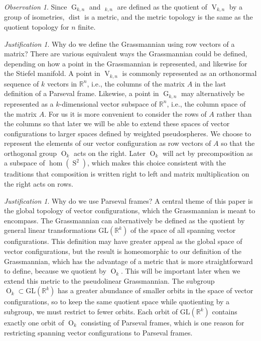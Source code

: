 \documentclass[11pt]{article}
\newcommand{\ie}{i.e.,\xspace}
\numberwithin{equation}{section}
\theoremstyle{remark}
\newtheorem{observation}[theorem]{Observation}
\newtheorem{justification}[theorem]{Justification}
\let\mb\mathbb
\DeclareMathOperator{\dist}{dist}
\DeclareMathOperator{\g}{G}
\DeclareMathOperator{\oG}{\widetilde G}
\DeclareMathOperator{\orth}{O}
\DeclareMathOperator{\stief}{V}
\DeclareMathOperator{\sphere}{S}
\begin{document}
\begin{observation}
Since $\g_{k,n}$ and $\oG_{k,n}$ are defined as the quotient of $\stief_{k,n}$ by a group of isometries, $\dist$ is a metric, and the metric topology is the same as the quotient topology for $n$ finite.
\end{observation}

\begin{justification}
Why do we define the Grassmannian using row vectors of a matrix?
There are various equivalent ways the Grassmannian could be defined, depen\-ding on how a point in the Grassmannian is represented, and likewise for the Stiefel manifold.
A point in $\stief_{k,n}$ is commonly represented as an orthonormal sequence of $k$ vectors in $\mb{R}^n$, \ie the columns of the matrix $A$ in the last definition of a Parseval frame.
Likewise, a point in $\g_{k,n}$ may alternatively be represented as a $k$-dimensional vector subspace of $\mb{R}^n$, \ie the column space of the matrix $A$.
For us it is more convenient to consider the rows of $A$ rather than the columns so that later we will be able to extend these spaces of vector configurations to larger spaces defined by weighted pseudospheres.
We choose to represent the elements of our vector configuration as row vectors of $A$ so that the orthogonal group $\orth_k$ acts on the right. Later $\orth_k$ will act by precomposition as a subspace of $\hom(\sphere^2)$, which makes this choice consistent with the traditions that composition is written right to left and matrix multiplication on the right acts on rows.
\end{justification}

\begin{justification}
Why do we use Parseval frames?
A central theme of this paper is the global topology of vector configurations, which the Grassmannian is meant to encompass.
The Grassmannian can alternatively be defined as the quotient by general linear transformations $\mathrm{GL}(\mb{R}^k)$ of the space of all spanning vector configurations. This definition may have greater appeal as the global space of vector configurations, but the result is homeomorphic to our definition of the Grassmannian, which has the advantage of a metric that is more straightforward to define, because we quotient by $\orth_k$. This will be important later when we extend this metric to the pseudolinear Grassmannian.
The subgroup $\orth_k \subset \mathrm{GL}(\mb{R}^k)$ has a greater abundance of smaller orbits in the space of vector configurations, so to keep the same quotient space while quotienting by a subgroup, we must restrict to fewer orbits.
Each orbit of $\mathrm{GL}(\mb{R}^k)$ contains exactly one orbit of $\orth_k$ consisting of Parseval frames, which is one reason for restricting spanning vector configurations to Parseval frames.
\end{justification}
\end{document}
